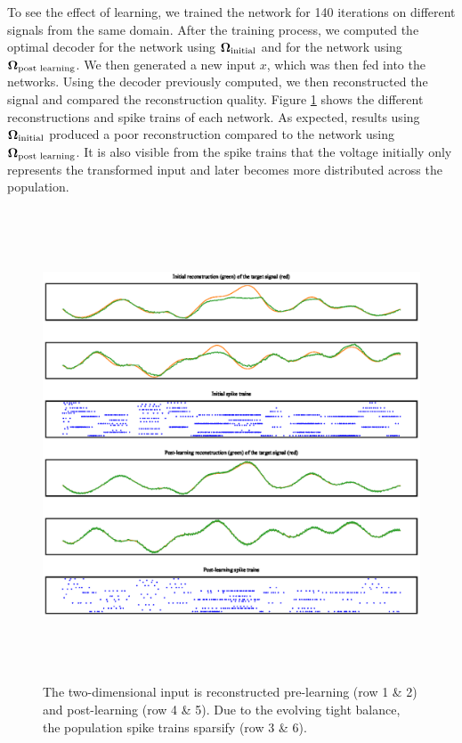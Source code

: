 \documentclass[twoside,11pt]{article}
\begin{document}
To see the effect of learning, we trained the network for 140
iterations on different signals from the same domain. After the training process, we
computed the optimal decoder for the network using $\mathbf{\Omega}_{\textnormal{initial}}$ and
for the network using $\mathbf{\Omega}_{\textnormal{post learning}}$. We then generated a
new input $x$, which was then fed into the networks.
Using the decoder previously computed, we then reconstructed the signal and
compared the reconstruction quality. Figure \ref{fig:reconstruction} shows the different
reconstructions and spike trains of each network. As expected, results using
$\mathbf{\Omega}_{\textnormal{initial}}$ produced a poor reconstruction
compared to the network using $\mathbf{\Omega}_{\textnormal{post learning}}$.
It is also visible from the spike trains that the voltage initially
only represents the transformed input and later becomes more distributed across
the population.


\begin{figure}[!htb]
  \includegraphics[width = \columnwidth, height=14cm]{figures/reconstruction.eps}
  \caption{The two-dimensional input is reconstructed pre-learning (row 1 \& 2) and
  post-learning (row 4 \& 5). Due to the evolving tight balance, the population
  spike trains sparsify (row 3 \& 6).}
  \label{fig:reconstruction}
\end{figure}
\newpage
\end{document}
